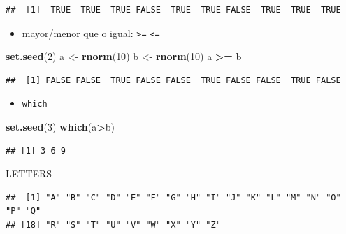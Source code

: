 \documentclass[]{book}
\newenvironment{Shaded}{\begin{snugshade}}{\end{snugshade}}
\newcommand{\KeywordTok}[1]{\textcolor[rgb]{0.13,0.29,0.53}{\textbf{#1}}}
\newcommand{\DecValTok}[1]{\textcolor[rgb]{0.00,0.00,0.81}{#1}}
\newcommand{\StringTok}[1]{\textcolor[rgb]{0.31,0.60,0.02}{#1}}
\newcommand{\OperatorTok}[1]{\textcolor[rgb]{0.81,0.36,0.00}{\textbf{#1}}}
\newcommand{\NormalTok}[1]{#1}
\providecommand{\tightlist}{%
  \setlength{\itemsep}{0pt}\setlength{\parskip}{0pt}}
\begin{document}
\begin{verbatim}
##  [1]  TRUE  TRUE  TRUE FALSE  TRUE  TRUE FALSE  TRUE  TRUE  TRUE
\end{verbatim}

\begin{itemize}
\tightlist
\item
  mayor/menor que o igual: \texttt{\textgreater{}=}
  \texttt{\textless{}=}
\end{itemize}

\begin{Shaded}
\begin{Highlighting}[]
\KeywordTok{set.seed}\NormalTok{(}\DecValTok{2}\NormalTok{)}
\NormalTok{a <-}\StringTok{ }\KeywordTok{rnorm}\NormalTok{(}\DecValTok{10}\NormalTok{)}
\NormalTok{b <-}\StringTok{ }\KeywordTok{rnorm}\NormalTok{(}\DecValTok{10}\NormalTok{)}
\NormalTok{a }\OperatorTok{>=}\StringTok{ }\NormalTok{b}
\end{Highlighting}
\end{Shaded}

\begin{verbatim}
##  [1] FALSE FALSE  TRUE FALSE FALSE  TRUE FALSE FALSE  TRUE FALSE
\end{verbatim}

\begin{itemize}
\tightlist
\item
  \texttt{which}
\end{itemize}

\begin{Shaded}
\begin{Highlighting}[]
\KeywordTok{set.seed}\NormalTok{(}\DecValTok{3}\NormalTok{)}
\KeywordTok{which}\NormalTok{(a}\OperatorTok{>}\NormalTok{b)}
\end{Highlighting}
\end{Shaded}

\begin{verbatim}
## [1] 3 6 9
\end{verbatim}

\begin{Shaded}
\begin{Highlighting}[]
\NormalTok{LETTERS}
\end{Highlighting}
\end{Shaded}

\begin{verbatim}
##  [1] "A" "B" "C" "D" "E" "F" "G" "H" "I" "J" "K" "L" "M" "N" "O" "P" "Q"
## [18] "R" "S" "T" "U" "V" "W" "X" "Y" "Z"
\end{verbatim}
\end{document}
